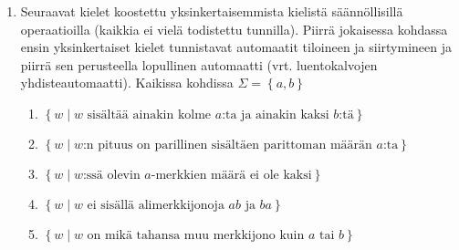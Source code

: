 \documentclass[finnish]{article}
\newcommand{\set}[1]{{\left\{ #1 \right\}}}
\begin{document}
\begin{enumerate}
\item
Seuraavat kielet koostettu yksinkertaisemmista kielistä säännöllisillä operaatioilla (kaikkia ei vielä todistettu tunnilla). Piirrä jokaisessa kohdassa ensin yksinkertaiset kielet tunnistavat automaatit tiloineen ja siirtymineen ja piirrä sen perusteella lopullinen automaatti (vrt. luentokalvojen yhdisteautomaatti). Kaikissa kohdissa $\Sigma = \set{a,b}$
\begin{enumerate}
\item 
$\set{w \mid \mbox{$w$ sisältää ainakin kolme $a$:ta ja ainakin kaksi $b$:tä}}$
\item
$\set{w \mid \mbox{$w$:n pituus on parillinen sisältäen parittoman määrän $a$:ta} }$
\item 
$\set{w \mid \mbox{$w$:ssä olevin $a$-merkkien määrä ei ole kaksi} }$
\item 
$\set{w \mid \mbox{$w$ ei sisällä alimerkkijonoja $ab$ ja $ba$} }$
\item
$\set{w \mid \mbox{$w$ on mikä tahansa muu merkkijono kuin $a$ tai $b$} }$ 
\end{enumerate}



\end{enumerate}
\end{document}
